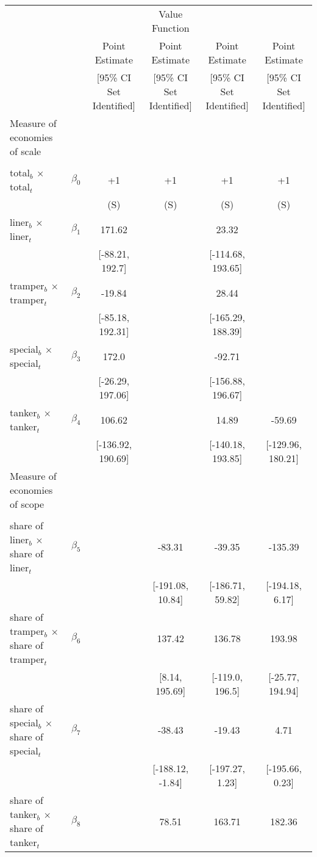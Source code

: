 \begin{tabular}{@{\extracolsep{5pt}}lccccc}
\toprule 
 &  &  & Value Function &  &  \\
 &  & Point Estimate & Point Estimate & Point Estimate & Point Estimate \\
 &  & [95\% CI Set Identified] & [95\% CI Set Identified] & [95\% CI Set Identified] & [95\% CI Set Identified] \\
\midrule 
Measure of economies of scale &  &  &  &  &  \\
 &  &  &  &  \\
total$_{b}$ $\times$ total$_{t}$ & $\beta_0$ & +1 & +1 & +1 & +1 \\
 &  & (S) & (S) & (S) & (S) \\
liner$_{b}$ $\times$ liner$_{t}$ & $\beta_1$ & 171.62 &  & 23.32 &  \\
 &  & [-88.21, 192.7] &  & [-114.68, 193.65] &  \\
tramper$_{b}$ $\times$ tramper$_{t}$ & $\beta_2$ & -19.84 &  & 28.44 &  \\
 &  & [-85.18, 192.31] &  & [-165.29, 188.39] &  \\
special$_{b}$ $\times$ special$_{t}$ & $\beta_3$ & 172.0 &  & -92.71 &  \\
 &  & [-26.29, 197.06] &  & [-156.88, 196.67] &  \\
tanker$_{b}$ $\times$ tanker$_{t}$ & $\beta_4$ & 106.62 &  & 14.89 & -59.69 \\
 &  & [-136.92, 190.69] &  & [-140.18, 193.85] & [-129.96, 180.21] \\
Measure of economies of scope &  &  &  &  &  \\
 &  &  &  &  &  \\
share of liner$_{b}$ $\times$ share of liner$_{t}$ & $\beta_5$ &  & -83.31 & -39.35 & -135.39 \\
 &  &  & [-191.08, 10.84] & [-186.71, 59.82] & [-194.18, 6.17] \\
share of tramper$_{b}$ $\times$ share of tramper$_{t}$ & $\beta_6$ &  & 137.42 & 136.78 & 193.98 \\
 &  &  & [8.14, 195.69] & [-119.0, 196.5] & [-25.77, 194.94] \\
share of special$_{b}$ $\times$ share of special$_{t}$ & $\beta_7$ &  & -38.43 & -19.43 & 4.71 \\
 &  &  & [-188.12, -1.84] & [-197.27, 1.23] & [-195.66, 0.23] \\
share of tanker$_{b}$ $\times$ share of tanker$_{t}$ & $\beta_8$ &  & 78.51 & 163.71 & 182.36 \\

\end{tabular}
